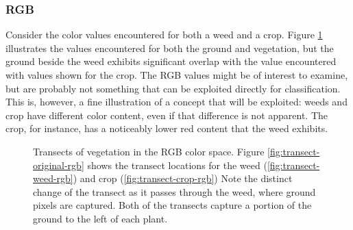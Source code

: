 \documentclass[letterpaper]{report}
\begin{document}
\subsubsection{RGB}
Consider the color values encountered for both a weed and a crop. Figure \ref{fig:transects-rgb} illustrates the values encountered for both the ground and vegetation, but the ground beside the weed exhibits significant overlap with the value encountered with values shown for the crop.  The RGB values might be of interest to examine, but are probably not something that can be exploited directly for classification. This is, however, a fine illustration of a concept that will be exploited: weeds and crop have different color content, even if that difference is not apparent.  The crop, for instance, has a noticeably lower red content that the weed exhibits.

\begin{figure}[h]
	\centering
	\hfill
	\hfill
	\caption[RGB Transects]{Transects of vegetation in the RGB color space. Figure \ref{fig:transect-original-rgb} shows the transect locations for the weed (\ref{fig:transect-weed-rgb}) and crop (\ref{fig:transect-crop-rgb}) Note the distinct change of the transect as it passes through the weed, where ground pixels are captured. Both of the transects capture a portion of the ground to the left of each plant.}
	\label{fig:transects-rgb}
\end{figure}
	
\end{document}
